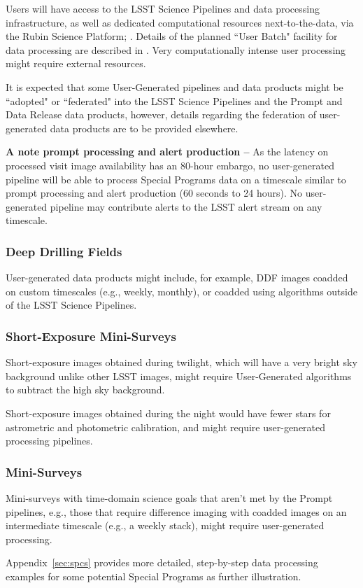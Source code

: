 Users will have access to the LSST Science Pipelines and data processing 
infrastructure, as well as dedicated computational resources next-to-the-data, 
via the Rubin Science Platform; .
Details of the planned ``User Batch" facility for data processing are described in 
.
Very computationally intense user processing might require external resources. 

It is expected that some User-Generated pipelines and data products 
might be ``adopted" or ``federated" into the LSST Science Pipelines and the Prompt 
and Data Release data products, however, details regarding the federation of 
user-generated data products are to be provided elsewhere.

\textbf{A note prompt processing and alert production -- }
As the latency on processed visit image availability has an 80-hour
embargo, no user-generated pipeline will be able to process Special Programs 
data on a timescale similar to prompt processing and alert production 
(60 seconds to 24 hours).
No user-generated pipeline may contribute alerts to the LSST alert stream on 
any timescale.


\subsubsection{Deep Drilling Fields}

User-generated data products might include, for example, DDF images coadded on custom 
timescales (e.g., weekly, monthly), or coadded using algorithms outside of the LSST 
Science Pipelines.


\subsubsection{Short-Exposure Mini-Surveys}

Short-exposure images obtained during twilight, which will have a very bright sky 
background unlike other LSST images, might require User-Generated algorithms to 
subtract the high sky background. 

Short-exposure images obtained during the night would have fewer stars for 
astrometric and photometric calibration, and might require user-generated 
processing pipelines.


\subsubsection{Mini-Surveys}

Mini-surveys with time-domain science goals that aren't met by the Prompt pipelines, 
e.g., those that require difference imaging with coadded images on an intermediate 
timescale (e.g., a weekly stack), might require user-generated processing.

Appendix~\ref{sec:spcs} provides more detailed, step-by-step data processing examples 
for some potential Special Programs as further illustration. 


